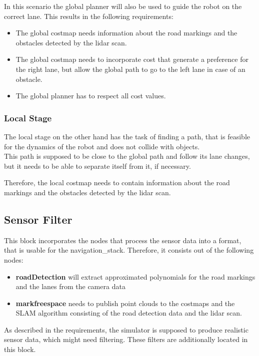 In this scenario the global planner will also be used to guide the robot on the correct lane. This results in the following requirements:

\begin{itemize}
	\item The global costmap needs information about the road markings and the obstacles detected by the lidar scan.
	\item The global costmap needs to incorporate cost that generate a preference for the right lane, but allow the global path to go to the left lane in case of an obstacle.
	\item The global planner has to respect all cost values.
\end{itemize}

\subsubsection{Local Stage}
The local stage on the other hand has the task of finding a path, that is feasible for the dynamics of the robot and does not collide with objects.\\
This path is supposed to be close to the global path and follow its lane changes, but it needs to be able to separate itself from it, if necessary.

Therefore, the local costmap needs to contain information about the road markings and the obstacles detected by the lidar scan.


\subsection{Sensor Filter}

This block incorporates the nodes that process the sensor data into a format, that is usable for the navigation\_stack. 
Therefore, it consists out of the following nodes:

\begin{itemize}
	\item \textbf{roadDetection} will extract approximated polynomials for the road markings and the lanes from the camera data
	\item \textbf{markfreespace} needs to publish point clouds to the costmaps and the SLAM algorithm consisting of the road detection data and the lidar scan.
\end{itemize}

As described in the requirements, the simulator is supposed to produce realistic sensor data, which might need filtering. These filters are additionally located in this block.

